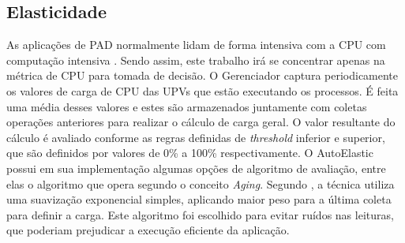 \documentclass[twoside,english,brazilian]{UNISINOSartigo}
\begin{document}
\subsection{Elasticidade}
As aplicações de PAD normalmente lidam de forma intensiva com a CPU com computação intensiva \cite{6005369}. Sendo assim, este trabalho irá se concentrar apenas na métrica de CPU para tomada de decisão. O Gerenciador captura periodicamente os valores de carga de CPU das UPVs que estão executando os processos. É feita uma média desses valores e estes são armazenados juntamente com coletas operações anteriores para realizar o cálculo de carga geral. O valor resultante do cálculo é avaliado conforme as regras definidas de \textit{threshold} inferior e superior, que são definidos por valores de 0\% a 100\% respectivamente. O AutoElastic possui em sua implementação algumas opções de algoritmo de avaliação, entre elas o algoritmo que opera segundo o conceito \textit{Aging}. Segundo , a técnica utiliza uma suavização exponencial simples, aplicando maior peso para a última coleta para definir a carga. Este algoritmo foi escolhido para evitar ruídos nas leituras, que poderiam prejudicar a execução eficiente da aplicação.
\end{document}
